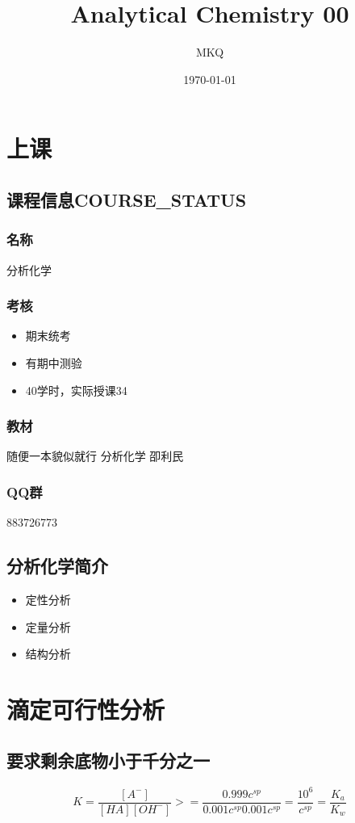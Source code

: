 \documentclass[11pt]{article}
\author{MKQ}
\date{\today}
\title{Analytical Chemistry 00}
\begin{document}
\maketitle
\tableofcontents


\section{上课}
\label{sec:org442f052}
\subsection{课程信息\hfill{}\textsc{COURSE\_STATUS}}
\label{sec:org6e803bd}
\subsubsection{名称}
\label{sec:org8ec2f95}
分析化学
\subsubsection{考核}
\label{sec:org70c3585}
\begin{itemize}
\item 期末统考
\item 有期中测验
\item 40学时，实际授课34
\end{itemize}
\subsubsection{教材}
\label{sec:orgd6f57fa}
随便一本貌似就行
分析化学 卲利民
\subsubsection{QQ群}
\label{sec:orgeed6c88}
883726773


\subsection{分析化学简介}
\label{sec:org2ed7d11}
\begin{itemize}
\item 定性分析
\item 定量分析
\item 结构分析
\end{itemize}


\section{滴定可行性分析}
\label{sec:orgbf864c7}
\subsection{要求剩余底物小于千分之一}
\label{sec:orgb3f576f}
\[
K=\frac{[A^-]}{[HA][OH^-]}>=\frac{0.999c^{sp}}{0.001c^{sp} 0.001c^{sp}}=\frac{10^6}{c^{sp}}=\frac{K_a}{K_w}
\]
\end{document}
